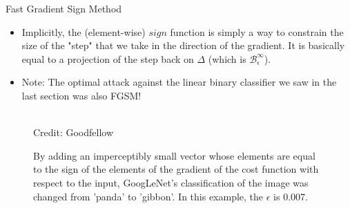 \begin{vbframe} {Fast Gradient Sign Method}
\begin{itemize}
\begin{figure}
      \tiny{\\Credit: Kolter and Madry}
      \caption{$\deltab$ is obtained by setting each element of $\nabla_{\xv} L\left(y, \fh(\xv | \thetab) \right)$ to $-\epsilon$ or $\epsilon$ depending on its sign. Note that this slightly changes the direction of the step that is taken.}
  \end{figure}
        \item Implicitly, the (element-wise) $sign$ function is simply a way to constrain the size of the "step" that we take in the direction of the gradient. It is basically equal to a projection of the step back on $\Delta$ (which is $\mathcal{B}^{\infty}_{\epsilon}$).
        \end{itemize}
      \framebreak
        \begin{itemize}
           \item Note: The optimal attack against the linear binary classifier we saw in the last section was also FGSM!
            \end{itemize}
  \begin{figure}
    \centering
      \tiny{\\Credit: Goodfellow}
      \caption{\small{By adding an imperceptibly small vector whose elements are equal to the sign of the elements of the gradient of the cost function with respect to the input, GoogLeNet's classification of the image was changed from 'panda' to 'gibbon'. In this example, the $\epsilon$ is 0.007.}}
  \end{figure}
\end{vbframe}


